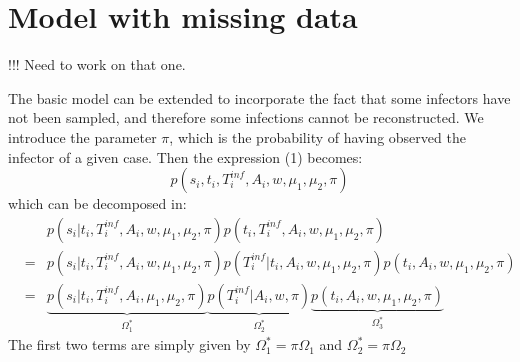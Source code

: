 \documentclass[10pt]{article}
\begin{document}
\section*{Model with missing data}
!!! Need to work on that one. 

The basic model can be extended to incorporate the fact that some infectors have not been sampled, and therefore some infections cannot be reconstructed.
We introduce the parameter $\pi$, which is the probability of having observed the infector of a given case.
Then the expression (1) becomes:
\begin{equation}
 p(s_i, t_i, T_i^{inf}, A_i, w, \mu_1, \mu_2, \pi)
\end{equation}
which can be decomposed in:
\begin{eqnarray}
& & p(s_i | t_i, T_i^{inf}, A_i, w, \mu_1, \mu_2, \pi)  p(t_i, T_i^{inf}, A_i, w, \mu_1, \mu_2, \pi)\\
&=& p(s_i | t_i, T_i^{inf}, A_i, w, \mu_1, \mu_2, \pi)  p(T_i^{inf} | t_i, A_i, w, \mu_1, \mu_2, \pi) p(t_i, A_i, w, \mu_1, \mu_2, \pi)\\
&=& \underbrace{p(s_i | t_i, T_i^{inf}, A_i, \mu_1, \mu_2, \pi)}_{\Omega^*_1}  
    \underbrace{p(T_i^{inf} | A_i, w, \pi)}_{\Omega^*_2}
    \underbrace{p(t_i, A_i, w, \mu_1, \mu_2, \pi)}_{\Omega^*_3} 
\end{eqnarray}
The first two terms are simply given by $\Omega^*_1 = \pi \Omega_1$ and $\Omega^*_2 = \pi \Omega_2$

% 
% 
% 
% 
% 
%   
% 
\end{document}
